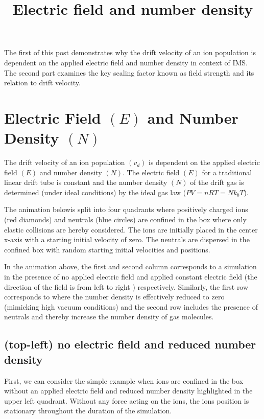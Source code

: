 \documentclass[10pt,a4paper,final]{article}
\title{Electric field and number density}
\begin{document}
The first of this post demonstrates why the drift velocity of an ion population is dependent on the applied electric field and number density in context of IMS. The second part examines the key scaling factor known as field strength and its relation to drift velocity.


\section{Electric Field $(E)$ and Number Density $(N)$}


The drift velocity of an ion population $(v_d)$ is dependent on the applied electric field $(E)$ and number density $(N)$. 
The electric field $(E)$ for a traditional linear drift tube is constant and the number density $(N)$ of the drift gas is determined (under ideal conditions) by the ideal gas law ($PV=nRT=Nk_bT$).

The animation belowis split into four quadrants where positively charged ions (red diamonds) and neutrals (blue circles) are confined in the box where only elastic collisions are hereby considered. The ions are initially placed in the center x-axis with a starting initial velocity of zero. The neutrals are dispersed in the confined box with random starting initial velocities and positions.

In the animation above, the first and second column corresponds to a simulation in the presence of no applied electric field and applied constant electric field (the direction of the field is from left to right ) respectively. Similarly, the first row corresponds to where the number density is effectively reduced to zero (mimicking high vacuum conditions) and the second row includes the presence of neutrals and thereby increase the number density of gas molecules.


\subsection{(top-left) no electric field and reduced number density}
First, we can consider the simple example when ions are confined in the box without an applied electric field and reduced number density highlighted in the upper left quadrant. Without any force acting on the ions, the ions position is stationary throughout the duration of the simulation.
\end{document}
